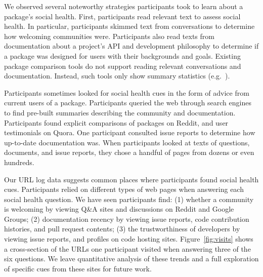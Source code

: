 We observed several noteworthy strategies participants took to learn about a package's social health.
First, participants read relevant text to assess social health.
In particular, participants skimmed text from conversations to determine how welcoming communities were.
Participants also read texts from documentation about a project's API and development philosophy to determine if a package was designed for users with their backgrounds and goals.
Existing package comparison tools do not support reading relevant conversations and documentation.
Instead, such tools only show summary statistics (e.g.~\cite{awesome_python,ruby_toolbox}).

Participants sometimes looked for social health cues in the form of advice from current users of a package.
Participants queried the web through search engines to find pre-built summaries describing the community and documentation.
Participants found explicit comparisons of packages on Reddit, and user testimonials on Quora.
One participant consulted issue reports to determine how up-to-date documentation was.
When participants looked at texts of questions, documents, and issue reports, they chose a handful of pages from dozens or even hundreds.

Our URL log data suggests common places where participants found social health cues.
Participants relied on different types of web pages when answering each social health question.
We have seen participants find:
(1) whether a community is welcoming by viewing Q\&A sites and discussions on Reddit and Google Groups;
(2) documentation recency by viewing issue reports, code contribution histories, and pull request contents;
(3) the trustworthiness of developers by viewing issue reports, and profiles on code hosting sites.
Figure~\ref{fig:visits} shows a cross-section of the URLs one participant visited when answering three of the six questions.
We leave quantitative analysis of these trends and a full exploration of specific cues from these sites for future work.

